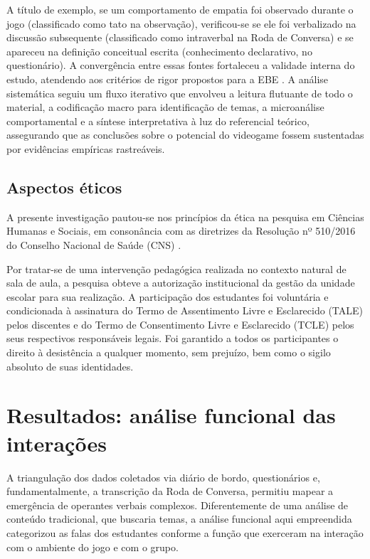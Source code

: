 \documentclass[portuguese]{textolivre}
\begin{document}
A título de exemplo, se um comportamento de empatia foi observado durante o jogo (classificado como tato na observação), verificou-se se ele foi verbalizado na discussão subsequente (classificado como intraverbal na Roda de Conversa) e se apareceu na definição conceitual escrita (conhecimento declarativo, no questionário). A convergência entre essas fontes fortaleceu a validade interna do estudo, atendendo aos critérios de rigor propostos para a EBE \cite{davies1999evidence,slavin1996education}. A análise sistemática seguiu um fluxo iterativo que envolveu a leitura flutuante de todo o material, a codificação macro para identificação de temas, a microanálise comportamental e a síntese interpretativa à luz do referencial teórico, assegurando que as conclusões sobre o potencial do videogame fossem sustentadas por evidências empíricas rastreáveis.

\subsection{Aspectos éticos}

A presente investigação pautou-se nos princípios da ética na pesquisa em Ciências Humanas e Sociais, em consonância com as diretrizes da Resolução nº 510/2016 do Conselho Nacional de Saúde (CNS) \cite{brasil2016resolucao510}.

Por tratar-se de uma intervenção pedagógica realizada no contexto natural de sala de aula, a pesquisa obteve a autorização institucional da gestão da unidade escolar para sua realização. A participação dos estudantes foi voluntária e condicionada à assinatura do Termo de Assentimento Livre e Esclarecido (TALE) pelos discentes e do Termo de Consentimento Livre e Esclarecido (TCLE) pelos seus respectivos responsáveis legais. Foi garantido a todos os participantes o direito à desistência a qualquer momento, sem prejuízo, bem como o sigilo absoluto de suas identidades.

\section{Resultados: análise funcional das interações}
A triangulação dos dados coletados via diário de bordo, questionários e, fundamentalmente, a transcrição da Roda de Conversa, permitiu mapear a emergência de operantes verbais complexos. Diferentemente de uma análise de conteúdo tradicional, que buscaria temas, a análise funcional aqui empreendida categorizou as falas dos estudantes conforme a função que exerceram na interação com o ambiente do jogo e com o grupo.
\end{document}
